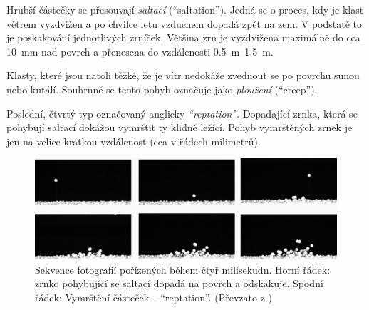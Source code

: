 Hrubší částečky se přesouvají \emph{saltací} (\enquote{saltation}). Jedná se o proces, kdy je klast větrem vyzdvižen a po chvilce letu vzduchem dopadá zpět na zem. V podstatě to je poskakování jednotlivých zrníček. Většina zrn je vyzdvižena maximálně do cca \SI{10}{\milli\metre} nad povrch a přenesena do vzdálenosti \SIrange{0,5}{1,5}{\metre}.

Klasty, které jsou natoli těžké, že je vítr nedokáže zvednout se po povrchu sunou nebo kutálí. Souhrnně se tento pohyb označuje jako \emph{ploužení} (\enquote{creep}).

Poslední, čtvrtý typ označovaný anglicky \emph{\enquote{reptation}}. Dopadající zrnka, která se pohybují saltací dokážou vymrštit ty klidně ležící. Pohyb vymrštěných zrnek je jen na velice krátkou vzdálenost (cca v řádech milimetrů).

\begin{figure}
	\centering
	\includegraphics[width=1\linewidth]{obrazky/eolicka/saltace_foto}
	\caption{Sekvence fotografií pořízených během čtyř milisekudn. Horní řádek: zrnko pohybující se saltací dopadá na povrch a odskakuje. Spodní řádek: Vymrštění částeček -- \enquote{reptation}. (Převzato z \textcite{beladjineCollisionProcessIncident2007})}
	\label{fig:saltacefoto}
\end{figure}


%

